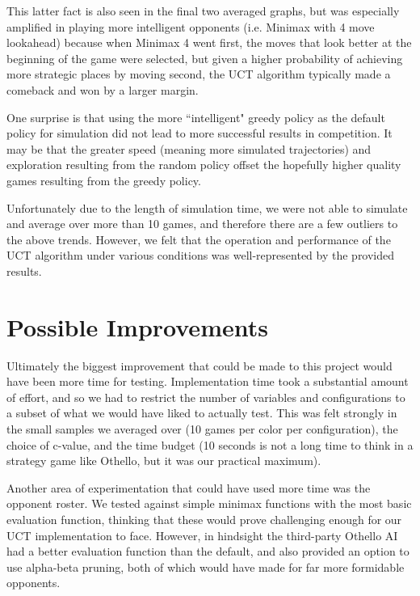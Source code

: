 \documentclass[12pt,letterpaper]{article}
\begin{document}
This latter fact is also seen in the final two averaged graphs, but was especially amplified in playing more intelligent opponents (i.e. Minimax with 4 move lookahead) because when Minimax 4 went first, the moves that look better at the beginning of the game were selected, but given a higher probability of achieving more strategic places by moving second, the UCT algorithm typically made a comeback and won by a larger margin.

One surprise is that using the more ``intelligent" greedy policy as the default policy for simulation did not lead to more successful results in competition. It may be that the greater speed (meaning more simulated trajectories) and exploration resulting from the random policy offset the hopefully higher quality games resulting from the greedy policy.

Unfortunately due to the length of simulation time, we were not able to simulate and average over more than 10 games, and therefore there are a few outliers to the above trends.  However, we felt that the operation and performance of the UCT algorithm under various conditions was well-represented by the provided results.

\section{Possible Improvements}
\label{impr}
Ultimately the biggest improvement that could be made to this project would have been more time for testing. Implementation time took a substantial amount of effort, and so we had to restrict the number of variables and configurations to a subset of what we would have liked to actually test. This was felt strongly in the small samples we averaged over (10 games per color per configuration), the choice of c-value, and the time budget (10 seconds is not a long time to think in a strategy game like Othello, but it was our practical maximum).

Another area of experimentation that could have used more time was the opponent roster. We tested against simple minimax functions with the most basic evaluation function, thinking that these would prove challenging enough for our UCT implementation to face. However, in hindsight the third-party Othello AI had a better evaluation function than the default, and also provided an option to use alpha-beta pruning, both of which would have made for far more formidable opponents.
\end{document}

